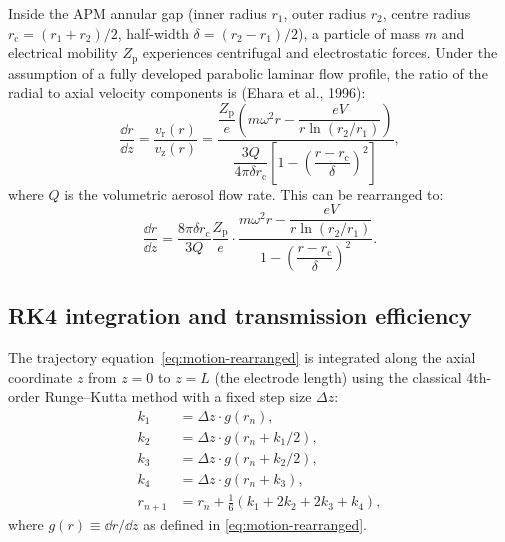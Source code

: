 \documentclass[11pt,a4paper]{article}
\begin{document}
Inside the APM annular gap (inner radius $r_{1}$, outer radius $r_{2}$,
centre radius $r_{\mathrm{c}} = (r_{1} + r_{2})/2$, half-width
$\delta = (r_{2} - r_{1})/2$), a particle of mass $m$ and electrical
mobility $Z_{\mathrm{p}}$ experiences centrifugal and electrostatic forces.
Under the assumption of a fully developed parabolic laminar flow profile, the
ratio of the radial to axial velocity components is
(Ehara et al., 1996):
\begin{equation}
  \frac{\dd r}{\dd z}
  = \frac{v_{\mathrm{r}}(r)}{v_{\mathrm{z}}(r)}
  = \frac{\dfrac{Z_{\mathrm{p}}}{e}
      \left( m \omega^{2} r
             - \dfrac{eV}{r \ln(r_{2}/r_{1})} \right)}
    {\dfrac{3Q}{4\pi \delta r_{\mathrm{c}}}
      \left[ 1 - \left(\dfrac{r - r_{\mathrm{c}}}{\delta}\right)^{2}
      \right]},
  \label{eq:motion-raw}
\end{equation}
where $Q$ is the volumetric aerosol flow rate.  This can be rearranged to:
\begin{equation}
  \frac{\dd r}{\dd z}
  = \frac{8\pi \delta r_{\mathrm{c}}}{3Q}
    \frac{Z_{\mathrm{p}}}{e} \cdot
    \frac{m \omega^{2} r
          - \dfrac{eV}{r \ln(r_{2}/r_{1})}}
         {1 - \left(\dfrac{r - r_{\mathrm{c}}}{\delta}\right)^{2}}.
  \label{eq:motion-rearranged}
\end{equation}

\subsection{RK4 integration and transmission efficiency}
\label{sec:rk4}

The trajectory equation~\eqref{eq:motion-rearranged} is integrated along the
axial coordinate $z$ from $z = 0$ to $z = L$ (the electrode length) using
the classical 4th-order Runge--Kutta method with a fixed step size $\Delta z$:
\begin{align}
  k_{1} &= \Delta z \cdot g(r_{n}),
    \label{eq:rk4-k1} \\
  k_{2} &= \Delta z \cdot g(r_{n} + k_{1}/2),
    \label{eq:rk4-k2} \\
  k_{3} &= \Delta z \cdot g(r_{n} + k_{2}/2),
    \label{eq:rk4-k3} \\
  k_{4} &= \Delta z \cdot g(r_{n} + k_{3}),
    \label{eq:rk4-k4} \\
  r_{n+1} &= r_{n} + \frac{1}{6}(k_{1} + 2k_{2} + 2k_{3} + k_{4}),
    \label{eq:rk4-update}
\end{align}
where $g(r) \equiv \dd r / \dd z$ as defined in
\eqref{eq:motion-rearranged}.
\end{document}
